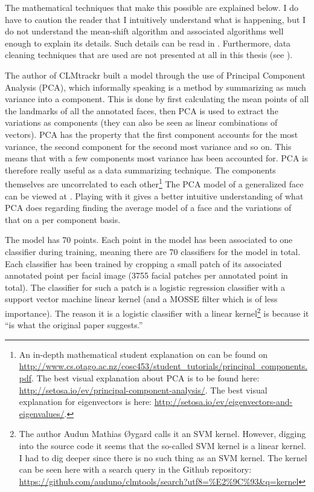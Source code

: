 The mathematical techniques that make this possible are explained below. I do have to caution the reader that I intuitively understand what is happening, but I do not understand the mean-shift algorithm and associated algorithms well enough to explain its details. Such details can be read in \cite{saragih2009}. Furthermore, data cleaning techniques that are used are not presented at all in this thesis (see \cite{saragih2009}).

The author of CLMtrackr built a model through the use of Principal Component Analysis (PCA), which informally speaking is a method by summarizing as much variance into a component. This is done by first calculating the mean points of all the landmarks of all the annotated faces, then PCA is used to extract the variations as components (they can also be seen as linear combinations of vectors). PCA has the property that the first component accounts for the most variance, the second component for the second most variance and so on. This means that with a few components most variance has been accounted for. PCA is therefore really useful as a data summarizing technique. The components themselves are uncorrelated to each other\footnote{An in-depth mathematical student explanation on can be found on \url{http://www.cs.otago.ac.nz/cosc453/student_tutorials/principal_components.pdf}. The best visual explanation about PCA is to be found here: \url{http://setosa.io/ev/principal-component-analysis/}. The best visual explanation for eigenvectors is here: \url{http://setosa.io/ev/eigenvectors-and-eigenvalues/}.} The PCA model of a generalized face can be viewed at \cite{clmtrackr_model_viewer}. Playing with it gives a better intuitive understanding of what PCA does regarding finding the average model of a face and the variations of that on a per component basis. 

The model has 70 points. Each point in the model has been associated to one classifier during training, meaning there are 70 classifiers for the model in total. Each classifier has been trained by cropping a small patch of its associated annotated point per facial image (3755 facial patches per annotated point in total). The classifier for such a patch is a logistic regression classifier with a support vector machine linear kernel (and a MOSSE filter which is of less importance). The reason it is a logistic classifier with a linear kernel\footnote{The author Audun Mathias Øygard calls it an SVM kernel. However, digging into the source code it seems that the so-called SVM kernel is a linear kernel. I had to dig deeper since there is no such thing as an SVM kernel. The kernel can be seen here with a search query in the Github repository: \url{https://github.com/auduno/clmtools/search?utf8=\%E2\%9C\%93&q=kernel}} is because it ``is what the original paper suggests.'' \cite{auduno2014}

